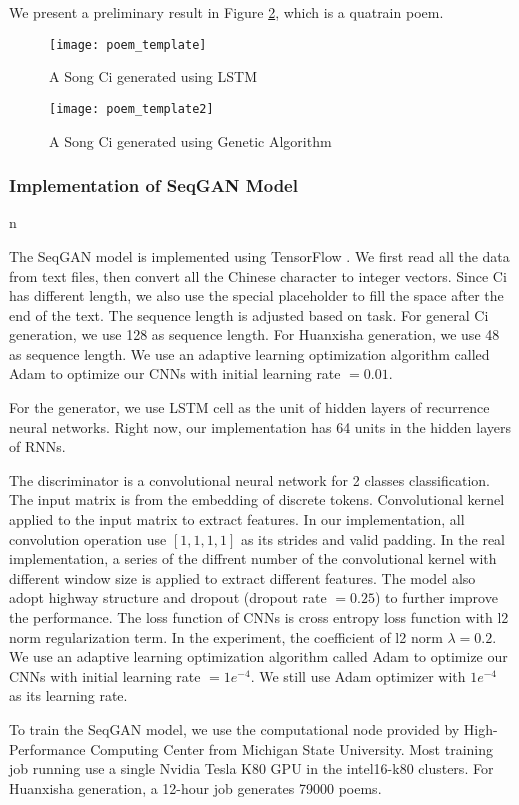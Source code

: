 We present a preliminary result in Figure \ref{fig:poetry}, which is a quatrain poem.

\begin{figure}[htbp]
	\centering
	\texttt{[image: poem\_template]}
	\caption{A Song Ci generated using LSTM}
	\label{fig:poetry}
\end{figure}

\begin{figure}[htbp]
	\centering
	\texttt{[image: poem\_template2]}
	\caption{A Song Ci generated using Genetic Algorithm }
	\label{fig:poetry}

\end{figure}


\subsubsection{Implementation of SeqGAN Model} n

The SeqGAN model is implemented using TensorFlow \cite{tensorflow}. We first read all the data from text files, then convert all the Chinese character to integer vectors. Since Ci has different length, we also use the special placeholder to fill the space after the end of the text. The sequence length is adjusted based on task. For general Ci generation, we use 128 as sequence length. For Huanxisha generation, we use 48 as sequence length. We use an adaptive learning optimization algorithm called Adam \cite{kingma2014adam} to optimize our CNNs with initial learning rate $ =  0.01 $.

For the generator, we use LSTM cell \cite{hochreiter1997lstm} as the unit of hidden layers of recurrence neural networks. Right now, our implementation has 64 units in the hidden layers of RNNs.

The discriminator is a convolutional neural network for 2 classes classification. The input matrix is from the embedding of discrete tokens. Convolutional kernel applied to the input matrix to extract features. In our implementation, all convolution operation use $ [1, 1, 1, 1]  $ as its strides and valid padding. In the real implementation, a series of the diffrent number of the convolutional kernel with different window size is applied to extract different features. The model also adopt highway structure \cite{srivastava2015highway} and dropout (dropout rate $ = 0.25 $)\cite{hinton2012dropout} to further improve the performance. The loss function of CNNs is cross entropy loss function with l2 norm regularization term. In the experiment, the coefficient of l2 norm $ \lambda =  0.2 $. We use an adaptive learning optimization algorithm called Adam \cite{kingma2014adam} to optimize our CNNs with initial learning rate $ =  1e^{-4} $. We still use Adam optimizer with $ 1e^{-4} $ as its learning rate.

To train the SeqGAN model, we use the computational node provided by High-Performance Computing Center from Michigan State University. Most training job running use a single Nvidia Tesla K80 GPU in the  intel16-k80 clusters. For Huanxisha generation, a 12-hour job generates 79000 poems.

